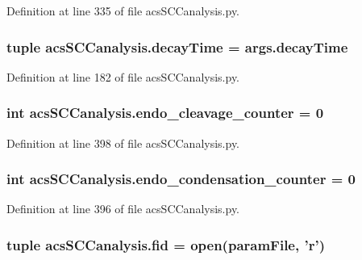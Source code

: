 Definition at line 335 of file acs\-S\-C\-Canalysis.\-py.

\hypertarget{a00097_a29728f750a3b57770e836db8409767e9}{
\subsubsection[{decay\-Time}]{\setlength{\rightskip}{0pt plus 5cm}tuple acs\-S\-C\-Canalysis.\-decay\-Time = args.\-decay\-Time}}\label{a00097_a29728f750a3b57770e836db8409767e9}


Definition at line 182 of file acs\-S\-C\-Canalysis.\-py.

\hypertarget{a00097_af5702a39b502da88dde8c38417a0efbd}{
\subsubsection[{endo\-\_\-cleavage\-\_\-counter}]{\setlength{\rightskip}{0pt plus 5cm}int acs\-S\-C\-Canalysis.\-endo\-\_\-cleavage\-\_\-counter = 0}}\label{a00097_af5702a39b502da88dde8c38417a0efbd}


Definition at line 398 of file acs\-S\-C\-Canalysis.\-py.

\hypertarget{a00097_a20a51ec68106a5a97fb3a72f417ca4e6}{
\subsubsection[{endo\-\_\-condensation\-\_\-counter}]{\setlength{\rightskip}{0pt plus 5cm}int acs\-S\-C\-Canalysis.\-endo\-\_\-condensation\-\_\-counter = 0}}\label{a00097_a20a51ec68106a5a97fb3a72f417ca4e6}


Definition at line 396 of file acs\-S\-C\-Canalysis.\-py.

\hypertarget{a00097_a424e2204e89264a827e6cad861ebcbc1}{
\subsubsection[{fid}]{\setlength{\rightskip}{0pt plus 5cm}tuple acs\-S\-C\-Canalysis.\-fid = open({\bf param\-File}, '{\bf r}')}}\label{a00097_a424e2204e89264a827e6cad861ebcbc1}


